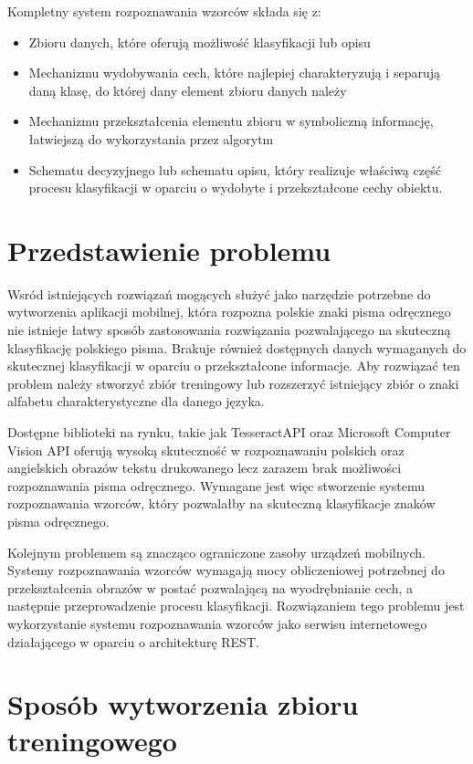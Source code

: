 \documentclass[brudnopis]{xmgr}
\begin{document}
Kompletny system rozpoznawania wzorców składa się z:
\begin{itemize}
\item
Zbioru danych, które oferują możliwość klasyfikacji lub opisu
\item
Mechanizmu wydobywania cech, które najlepiej charakteryzują i separują daną klasę, do której dany element zbioru danych należy
\item
Mechanizmu przekształcenia elementu zbioru w symboliczną informację, łatwiejszą do wykorzystania przez algorytm
\item
Schematu decyzyjnego lub schematu opisu, który realizuje właściwą część procesu klasyfikacji w oparciu o wydobyte i przekształcone cechy obiektu.
\end{itemize}

\section{Przedstawienie problemu}

Wsród istniejących rozwiązań mogących służyć jako narzędzie potrzebne do wytworzenia aplikacji mobilnej, która rozpozna polskie znaki pisma odręcznego nie istnieje łatwy sposób zastosowania rozwiązania pozwalającego na skuteczną klasyfikację polskiego pisma. Brakuje również dostępnych danych wymaganych do skutecznej klasyfikacji w oparciu o przekształcone informacje. Aby rozwiązać ten problem należy stworzyć zbiór treningowy lub rozszerzyć istniejący zbiór o znaki alfabetu charakterystyczne dla danego języka.

Dostępne biblioteki na rynku, takie jak TesseractAPI\cite{10} oraz Microsoft Computer Vision API\cite{9} oferują wysoką skuteczność w rozpoznawaniu polskich oraz angielskich obrazów tekstu drukowanego lecz zarazem brak możliwości rozpoznawania pisma odręcznego. Wymagane jest więc stworzenie systemu rozpoznawania wzorców, który pozwalałby na skuteczną klasyfikacje znaków pisma odręcznego.

Kolejnym problemem są znacząco ograniczone zasoby urządzeń mobilnych. Systemy rozpoznawania wzorców wymagają mocy obliczeniowej potrzebnej do przekształcenia obrazów w postać pozwalającą na wyodrębnianie cech, a następnie przeprowadzenie procesu klasyfikacji. Rozwiązaniem tego problemu jest wykorzystanie systemu rozpoznawania wzorców jako serwisu internetowego działającego w oparciu o architekturę REST\cite{5}.

\section{Sposób wytworzenia zbioru treningowego}
\end{document}

